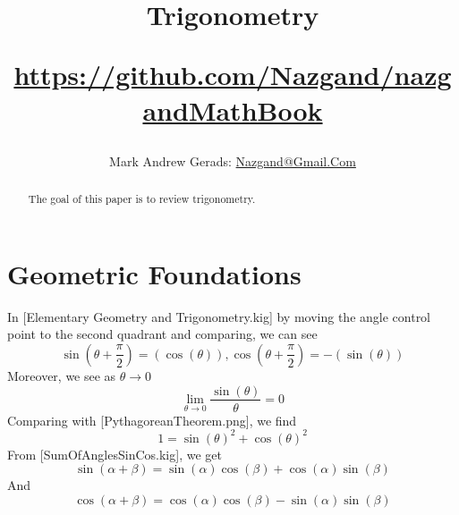 \documentclass[]{article}
\author{Mark Andrew Gerads: \href{MailTo:Nazgand@Gmail.Com}{Nazgand@Gmail.Com}}
\title{
	Trigonometry
	
	\href{https://github.com/Nazgand/nazgandMathBook}{https://github.com/Nazgand/nazgandMathBook}
}
\newcommand{\pqty}[1]{{\left(#1\right)}}
\numberwithin{equation}{section}
\begin{document}
	
	\maketitle
	
	\begin{abstract}
		The goal of this paper is to review trigonometry.
	\end{abstract}
	
	\section{Geometric Foundations}
	In [Elementary Geometry and Trigonometry.kig] by moving the angle control point to the second quadrant and comparing, we can see
	\begin{equation}
	\label{SinCosPhaseShift}
	\sin\pqty{\theta+\frac{\pi}{2}}=\pqty{\cos\pqty{\theta}}
	,
	\cos\pqty{\theta+\frac{\pi}{2}}=-\pqty{\sin\pqty{\theta}}
	\end{equation}
	Moreover, we see as \(\theta\to 0\)
	\begin{equation}
	\label{SinXOverXLimit}
	\lim\limits_{\theta\to 0}\frac{\sin\pqty{\theta}}{\theta}=0
	\end{equation}
	Comparing with [PythagoreanTheorem.png], we find
	\begin{equation}
	\label{SinCosPythagoras}
	1=\sin\pqty{\theta}^2+\cos\pqty{\theta}^2
	\end{equation}
	From [SumOfAnglesSinCos.kig], we get
	\begin{equation}
		\label{SinSumOfAngle}
		\sin\pqty{\alpha+\beta}=\sin\pqty{\alpha}\cos\pqty{\beta}+\cos\pqty{\alpha}\sin\pqty{\beta}
	\end{equation}
	And
	\begin{equation}
	\label{CosSumOfAngle}
	\cos\pqty{\alpha+\beta}=\cos\pqty{\alpha}\cos\pqty{\beta}-\sin\pqty{\alpha}\sin\pqty{\beta}
	\end{equation}
	
\end{document}
